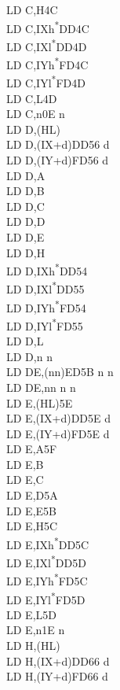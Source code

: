 \documentclass[twoside,openright,a4paper]{book}
\begin{document}
\begin{multicols}{3}
{\begin{tabbing}
	LD C,H\>4C\\
	LD C,IXh\textsuperscript{*}\>DD4C\\
	LD C,IXl\textsuperscript{*}\>DD4D\\
	LD C,IYh\textsuperscript{*}\>FD4C\\
	LD C,IYl\textsuperscript{*}\>FD4D\\
	LD C,L\>4D\\
	LD C,n\>0E n\\
	LD D,(HL)\\
	LD D,(IX+d)\>DD56 d\\
	LD D,(IY+d)\>FD56 d\\
	LD D,A\\
	LD D,B\\
	LD D,C\\
	LD D,D\\
	LD D,E\\
	LD D,H\\
	LD D,IXh\textsuperscript{*}\>DD54\\
	LD D,IXl\textsuperscript{*}\>DD55\\
	LD D,IYh\textsuperscript{*}\>FD54\\
	LD D,IYl\textsuperscript{*}\>FD55\\
	LD D,L\\
	LD D,n n\\
	LD DE,(nn)\>ED5B n n\\
	LD DE,nn n n\\
	LD E,(HL)\>5E\\
	LD E,(IX+d)\>DD5E d\\
	LD E,(IY+d)\>FD5E d\\
	LD E,A\>5F\\
	LD E,B\\
	LD E,C\\
	LD E,D\>5A\\
	LD E,E\>5B\\
	LD E,H\>5C\\
	LD E,IXh\textsuperscript{*}\>DD5C\\
	LD E,IXl\textsuperscript{*}\>DD5D\\
	LD E,IYh\textsuperscript{*}\>FD5C\\
	LD E,IYl\textsuperscript{*}\>FD5D\\
	LD E,L\>5D\\
	LD E,n\>1E n\\
	LD H,(HL)\\
	LD H,(IX+d)\>DD66 d\\
	LD H,(IY+d)\>FD66 d\\

\end{tabbing}}
\end{multicols}
\end{document}
